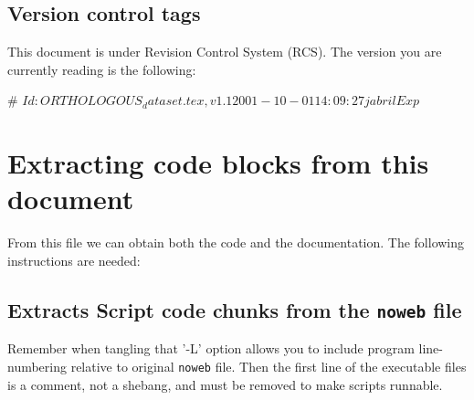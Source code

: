 \documentclass[11pt]{article}
\def\nwendcode{\endtrivlist \endgroup} %
\let\nwdocspar=\par                    %
\newcommand{\sctn}[1]{\section{#1}}
\newcommand{\subsctn}[1]{\subsection{#1}}
\begin{document}
\subsctn{Version control tags}

This document is under Revision Control System (RCS). The version you are currently reading is the following:

\nwenddocs{}\endmoddef
# $Id: ORTHOLOGOUS_dataset.tex,v 1.1 2001-10-01 14:09:27 jabril Exp $
\nwendcode{}\nwdocspar

\newpage

\sctn{Extracting code blocks from this document}

From this file we can obtain both the code and the
documentation. The following instructions are needed:

\subsctn{Extracts Script code chunks from the {\tt{}noweb} file} %

Remember when tangling that '-L' option allows you to include program line-numbering relative to original {\tt{}noweb} file. Then the first line of the executable files is a comment, not a shebang, and must be removed to make scripts runnable.
\end{document}
